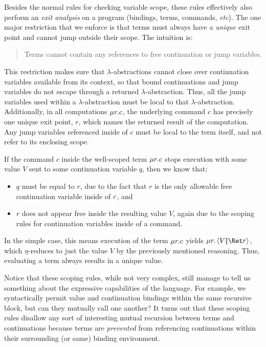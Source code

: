 \documentclass{article}
\begin{document}
Besides the normal rules for checking variable scope, these rules effectively
also perform an \emph{exit analysis} on a program (bindings, terms, commands,
\emph{etc}).  The one major restriction that we enforce is that terms must
always have a \emph{unique} exit point and cannot jump outside their scope.  The
intuition is:
\begin{quote}
  Terms cannot contain any references to free continuation or jump variables.
\end{quote}
This restriction makes sure that $\lambda$-abstractions cannot close over
continuation variables available from its context, so that bound continuations
and jump variables do not escape through a returned $\lambda$-abstraction.
Thus, all the jump variables used within a $\lambda$-abstraction must be local
to that $\lambda$-abstraction.  Additionally, in all computations
$\mu{r}.c$, the underlying command $c$ has precisely one unique exit point,
$r$, which names the returned result of the computation.  Any jump variables
referenced inside of $c$ must be local to the term itself, and not refer to its
enclosing scope.

If the command $c$ inside the well-scoped term $\mu{r}.c$ stops execution
with some value $V$ sent to some continuation variable $q$, then we know that:
\begin{itemize}
\item $q$ must be equal to $r$, due to the fact that $r$ is the only allowable
  free continuation variable inside of $c$, and
\item $r$ does not appear free inside the resulting value $V$, again due to the
  scoping rules for continuation variables inside of a command.
\end{itemize}
In the simple case, this means execution of the term $\mu{r}.c$ yields
$\comp{r}\cut{V}{\ret r}$, which $\eta$-reduces to just the value $V$ by the
previously mentioned reasoning.  Thus, evaluating a term always results in a
unique value.

Notice that these scoping rules, while not very complex, still manage to tell us
something about the expressive capabilities of the language.  For example, we
syntactically permit value and continuation bindings within the same recursive
block, but can they mutually call one another?  It turns out that these scoping
rules disallow any sort of interesting mutual recursion between terms and
continuations because terms are \emph{prevented} from referencing continuations
within their surrounding (or same) binding environment.
\end{document}
